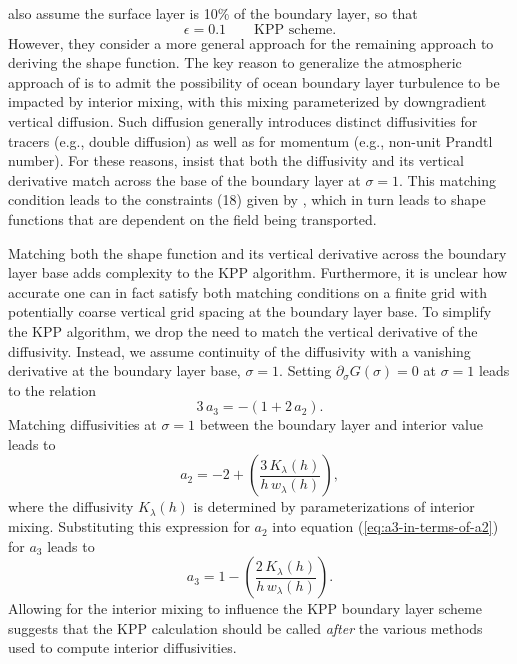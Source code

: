 \cite{LargeKPP} also assume the surface layer is 10\% of the boundary
layer, so that 
\begin{equation}
 \epsilon = 0.1 \qquad \mbox{KPP scheme.}
\end{equation}
However, they consider a more general approach for the remaining
approach to deriving the shape function.  The key reason to generalize
the atmospheric approach of \cite{Troen_Mahrt1986} is to admit the
possibility of ocean boundary layer turbulence to be impacted by
interior mixing, with this mixing parameterized by downgradient
vertical diffusion.  Such diffusion generally introduces distinct
diffusivities for tracers (e.g., double diffusion) as well as for
momentum (e.g., non-unit Prandtl number).  For these reasons,
\cite{LargeKPP} insist that both the diffusivity and its vertical
derivative match across the base of the boundary layer at $\sigma=1$.
This matching condition leads to the constraints (18) given by
\cite{LargeKPP}, which in turn leads to shape functions that are
dependent on the field being transported.

Matching both the shape function and its vertical derivative across
the boundary layer base adds complexity to the KPP algorithm.
Furthermore, it is unclear how accurate one can in fact satisfy both
matching conditions on a finite grid with potentially coarse vertical
grid spacing at the boundary layer base.  To simplify the KPP
algorithm, we drop the need to match the vertical derivative of the
diffusivity.  Instead, we assume continuity of the diffusivity with a
vanishing derivative at the boundary layer base, $\sigma=1$.  Setting
$\partial_{\sigma} G(\sigma) = 0$ at $\sigma=1$ leads to the relation
\begin{equation}
 3 \, a_{3} = -(1+ 2 \, a_{2}). 
\label{eq:a3-in-terms-of-a2}
\end{equation}
Matching diffusivities at $\sigma=1$ between the boundary layer and
interior value leads to
\begin{equation}
  a_{2}  = -2 + \left(\frac{3 \, K_{\lambda}(h)}{h \, w_{\lambda}(h)}
  \right),
\label{eq:a2-specified}
\end{equation}
where the diffusivity $K_{\lambda}(h)$ is determined by
parameterizations of interior mixing.  Substituting this expression
for $a_{2}$ into equation (\ref{eq:a3-in-terms-of-a2}) for $a_{3}$
leads to
\begin{equation}
 a_{3} = 1 - \left(\frac{2 \, K_{\lambda}(h)}{h \, w_{\lambda}(h)} \right).
\end{equation}
Allowing for the interior mixing to influence the KPP boundary layer
scheme suggests that the KPP calculation should be called {\it after}
the various methods used to compute interior diffusivities.  



